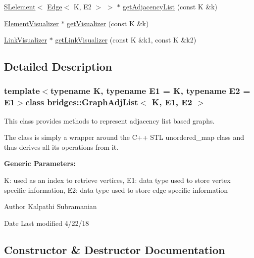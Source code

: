 \begin{DoxyCompactItemize}
\item 
\hyperlink{classbridges_1_1_s_lelement}{S\+Lelement}$<$ \hyperlink{classbridges_1_1_edge}{Edge}$<$ K, E2 $>$ $>$ $\ast$ \hyperlink{classbridges_1_1_graph_adj_list_ab9eb791b7c242742ac832121f297acdc}{get\+Adjacency\+List} (const K \&k)
\item 
\hyperlink{classbridges_1_1_element_visualizer}{Element\+Visualizer} $\ast$ \hyperlink{classbridges_1_1_graph_adj_list_a1c2c773a13dbd1fddd55bc2642c08574}{get\+Visualizer} (const K \&k)
\item 
\hyperlink{classbridges_1_1_link_visualizer}{Link\+Visualizer} $\ast$ \hyperlink{classbridges_1_1_graph_adj_list_a6e065b1411388387ff1e4df9227ce480}{get\+Link\+Visualizer} (const K \&k1, const K \&k2)
\end{DoxyCompactItemize}


\subsection{Detailed Description}
\subsubsection*{template$<$typename K, typename E1 = K, typename E2 = E1$>$class bridges\+::\+Graph\+Adj\+List$<$ K, E1, E2 $>$}

This class provides methods to represent adjacency list based graphs. 

The class is simply a wrapper around the C++ S\+T\+L unordered\+\_\+map class and thus derives all its operations from it.

{\bfseries Generic Parameters\+:} \begin{DoxyVerb}     K:  used as an index to retrieve vertices, 
     E1: data type used to store vertex specific information, 
     E2: data type used to store edge specific information
\end{DoxyVerb}


\begin{DoxyAuthor}{Author}
Kalpathi Subramanian 
\end{DoxyAuthor}
\begin{DoxyDate}{Date}
Last modified 4/22/18 
\end{DoxyDate}


\subsection{Constructor \& Destructor Documentation}
\hypertarget{classbridges_1_1_graph_adj_list_af7acceab0f85c75de56cf2fc74b3690b}{}
